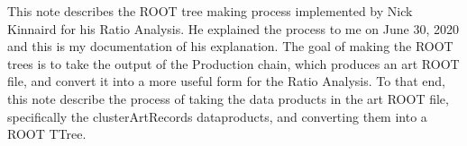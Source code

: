 This note describes the ROOT tree making process implemented by Nick Kinnaird for his Ratio Analysis. He explained the process to me on June 30, 2020 and this is my documentation of his explanation. The goal of making the ROOT trees is to take the output of the Production chain, which produces an art ROOT file, and convert it into a more useful form for the Ratio Analysis. To that end, this note describe the process of taking the data products in the art ROOT file, specifically the clusterArtRecords dataproducts, and converting them into a ROOT TTree.